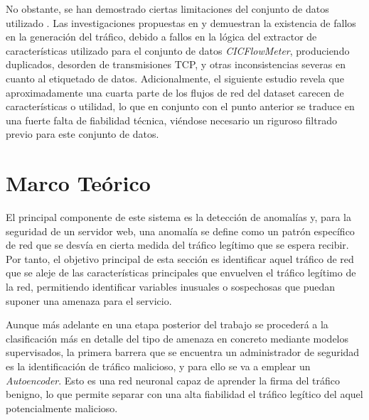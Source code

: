 \documentclass[12pt]{article}
\numberwithin{equation}{section} %
\begin{document}
    \vspace{5mm}

    No obstante, se han demostrado ciertas limitaciones del conjunto de datos utilizado \cite{CICIDS2017_paper}. Las investigaciones propuestas en \cite{engelen2021troubleshooting} y \cite{liu2022error} demuestran la existencia de fallos en la generación del tráfico, debido a fallos en la lógica del extractor de características utilizado para el conjunto de datos \textit{CICFlowMeter}, produciendo duplicados, desorden de transmisiones TCP, y otras inconsistencias severas en cuanto al etiquetado de datos. Adicionalmente, el siguiente estudio \cite{lanvin2023errors} revela que aproximadamente una cuarta parte de los flujos de red del dataset carecen de características o utilidad, lo que en conjunto con el punto anterior se traduce en una fuerte falta de fiabilidad técnica, viéndose necesario un riguroso filtrado previo para este conjunto de datos.

    \vspace{10mm}



    \newpage
    \thispagestyle{empty}
    \mbox{}





    \thispagestyle{empty}
    \section{Marco Teórico}

    \vspace{5mm}

    El principal componente de este sistema es la detección de anomalías y, para la seguridad de un servidor web, una anomalía se define como un patrón específico de red que se desvía en cierta medida del tráfico legítimo que se espera recibir. Por tanto, el objetivo principal de esta sección es identificar aquel tráfico de red que se aleje de las características principales que envuelven el tráfico legítimo de la red, permitiendo identificar variables inusuales o sospechosas que puedan suponer una amenaza para el servicio.

    \vspace{5mm}

    Aunque más adelante en una etapa posterior del trabajo se procederá a la clasificación más en detalle del tipo de amenaza en concreto mediante modelos supervisados, la primera barrera que se encuentra un administrador de seguridad es la identificación de tráfico malicioso, y para ello se va a emplear un \textit{Autoencoder}. Esto es una red neuronal capaz de aprender la firma del tráfico benigno, lo que permite separar con una alta fiabilidad el tráfico legítico del aquel potencialmente malicioso.
\end{document}
